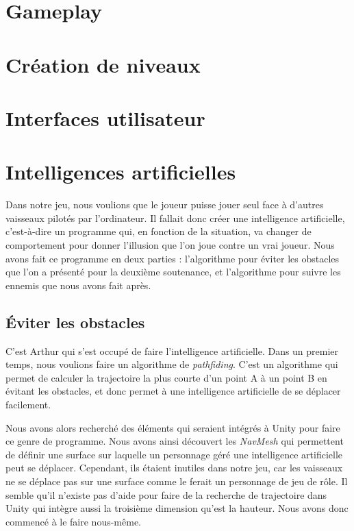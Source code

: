 \documentclass[12pt, titlepage]{article}
\begin{document}
\begin{spacing}{1.5}
\newpage
\section{Gameplay}

\newpage
\section{Création de niveaux}

\newpage
\section{Interfaces utilisateur}

\newpage
\section{Intelligences artificielles}

Dans notre jeu, nous voulions que le joueur puisse jouer seul face à d'autres vaisseaux pilotés par l'ordinateur. Il fallait donc créer une intelligence artificielle, c'est-à-dire un programme qui, en fonction de la situation, va changer de comportement pour donner l'illusion que l'on joue contre un vrai joueur. Nous avons fait ce programme en deux parties : l'algorithme pour éviter les obstacles que l'on a présenté pour la deuxième soutenance, et l'algorithme pour suivre les ennemis que nous avons fait après.

\subsection{Éviter les obstacles}

C'est Arthur qui s'est occupé de faire l'intelligence artificielle. Dans un premier temps, nous voulions faire un  algorithme de \textit{pathfiding}. C'est un algorithme qui permet de calculer la trajectoire la plus courte d'un point A à un point B en évitant les obstacles, et donc permet à une intelligence artificielle de se déplacer facilement.

Nous avons alors recherché des éléments qui seraient intégrés à Unity pour faire ce genre de programme. Nous avons ainsi découvert les \textit{NavMesh} qui permettent de définir une surface sur laquelle un personnage géré une intelligence artificielle peut se déplacer. Cependant, ils étaient inutiles dans notre jeu, car les vaisseaux ne se déplace pas sur une surface comme le ferait un personnage de jeu de rôle. Il semble qu'il n'existe pas d'aide pour faire de la recherche de trajectoire dans Unity qui intègre aussi la troisième dimension qu'est la hauteur. Nous avons donc commencé à le faire nous-même.


\end{spacing}
\end{document}
